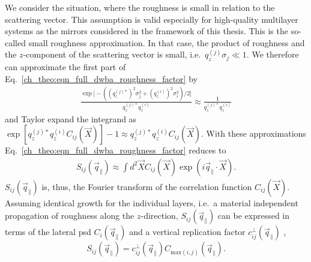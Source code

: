 We consider the situation, where the roughness is small in relation to the scattering vector. This assumption is valid especially for high-quality multilayer systems as the mirrors considered in the framework of this thesis. This is the so-called small roughness approximation. In that case, the product of roughness and the $z$-component of the scattering vector is small, i.e.~$q_z^{(j)} \sigma_j \ll 1$. We therefore can approximate the first part of Eq.~\eqref{ch_theo:eqn_full_dwba_roughness_factor} by
\begin{align}
\frac{\exp \Big[-((q_z^{(j)*})^2 \sigma_j^2 + (q_z^{(i)})^{2} \sigma_i^2)/2\Big]}{q_z^{(j)*} q_z^{(i)}} \approx \frac{1}{q_z^{(j)*} q_z^{(i)}}
\end{align}
and Taylor expand the integrand as $\exp [q_z^{(j)*} q_z^{(i)} C_{ij}(\vec{X})]-1 \approx q_z^{(j)*} q_z^{(i)} C_{ij}(\vec{X})$. With these approximations Eq.~\eqref{ch_theo:eqn_full_dwba_roughness_factor} reduces to
\begin{align}
S_{ij}(\vec{q}_\parallel) \approx \int d^2 \vec{X} C_{ij}(\vec{X}) \exp(i \vec{q}_\parallel \cdot \vec{X}) \text{.} \label{ch_theo:eqn_reduced_structure_factor}
\end{align}
$S_{ij}(\vec{q}_\parallel)$ is, thus, the Fourier transform of the correlation function $C_{ij}(\vec{X})$. Assuming identical growth for the individual layers, i.e.~a material independent propagation of roughness along the $z$-direction, $S_{ij}(\vec{q}_\parallel)$ can be expressed in terms of the lateral \gls{psd} $C_{i}(\vec{q}_\parallel)$ and a vertical replication factor $c_{ij}^{\perp}(\vec{q}_\parallel)$ \cite{spiller_multilayer_1993},
\begin{equation}
        S_{ij}(\vec{q}_\parallel) = c_{ij}^{\perp}(\vec{q}_\parallel) C_{\text{max}(i,j)}(\vec{q}_\parallel)\text{.} \label{eqn:factorized_structure_factor}
\end{equation}

